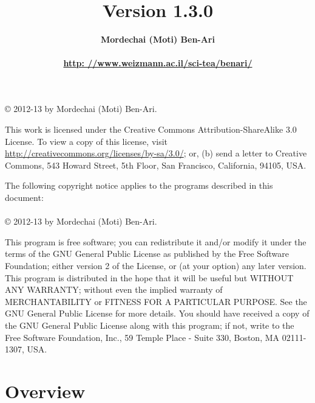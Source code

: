 \documentclass[11pt]{report}
\title{\bfseries \ls\\\mbox{}\\\mbox{}\\
\bfseries\normalsize Version 1.3.0}
\author{\bfseries Mordechai (Moti) Ben-Ari\\\mbox{}\\
\url{http: //www.weizmann.ac.il/sci-tea/benari/}}
\begin{document}
\maketitle

\thispagestyle{empty}

\vspace*{\fill}

\begin{center}
\copyright{} 2012-13 by Mordechai (Moti) Ben-Ari.
\end{center}
This work is licensed under the Creative Commons Attribution-ShareAlike 3.0
License. To view a copy of this license, visit
\url{http://creativecommons.org/licenses/by-sa/3.0/}; or, (b) send a letter
to Creative Commons, 543 Howard Street, 5th Floor, San Francisco,
California, 94105, USA.

\bigskip\bigskip

 
\begin{center}
The following copyright notice applies to the programs described in this
document:\mbox{}\\\mbox{}\\
\copyright{} 2012-13 by Mordechai (Moti) Ben-Ari.
\end{center}

This program is free software; you can redistribute it and/or
modify it under the terms of the GNU General Public License
as published by the Free Software Foundation; either version 2
of the License, or (at your option) any later version.
This program is distributed in the hope that it will be useful
but WITHOUT ANY WARRANTY; without even the implied warranty of
MERCHANTABILITY or FITNESS FOR A PARTICULAR PURPOSE.
See the GNU General Public License for more details.
You should have received a copy of the GNU General Public License
along with this program; if not, write to the Free Software
Foundation, Inc., 59 Temple Place - Suite 330, Boston, MA
02111-1307, USA.

\vspace*{\fill}

\tableofcontents

\thispagestyle{empty}

\setcounter{page}{0}

\newpage


\section*{Overview}
\end{document}
